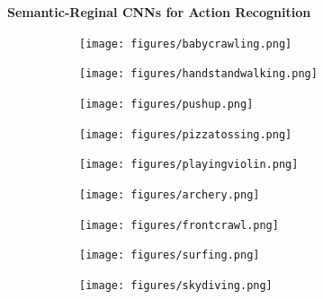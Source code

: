 \documentclass[a4paper,twoside,12pt]{scrbook}
\begin{document}




\begin{titlepage}
	\topmargin 1.0cm
	\oddsidemargin 0.0cm
	\evensidemargin 0.0cm
	\centering
	\Huge
	\vspace{3.0cm}
	\textbf{\textsf{Semantic-Reginal CNNs for Action Recognition}} \\[2.0cm]
\begin{figure}[h]\centering
\begin{subfigure}{0.16\linewidth}
\texttt{[image: figures/babycrawling.png]}
\end{subfigure}%
\begin{subfigure}{0.16\linewidth}
\texttt{[image: figures/handstandwalking.png]}
\end{subfigure}%
\begin{subfigure}{0.16\linewidth}
\texttt{[image: figures/pushup.png]}
\end{subfigure}%
\begin{subfigure}{0.16\linewidth}
\texttt{[image: figures/pizzatossing.png]}
\end{subfigure}%
\begin{subfigure}{0.16\linewidth}	    \texttt{[image: figures/playingviolin.png]}
\end{subfigure}%
\begin{subfigure}{0.16\linewidth}
\texttt{[image: figures/archery.png]}
\end{subfigure}
\begin{subfigure}{0.16\linewidth}
\texttt{[image: figures/frontcrawl.png]}
\end{subfigure}%
\begin{subfigure}{0.16\linewidth}
\texttt{[image: figures/surfing.png]}
\end{subfigure}%
\begin{subfigure}{0.16\linewidth}
\texttt{[image: figures/skydiving.png]}
\end{subfigure}%
\begin{subfigure}{0.16\linewidth}

\end{subfigure}
\end{figure}
\end{titlepage}
\end{document}
